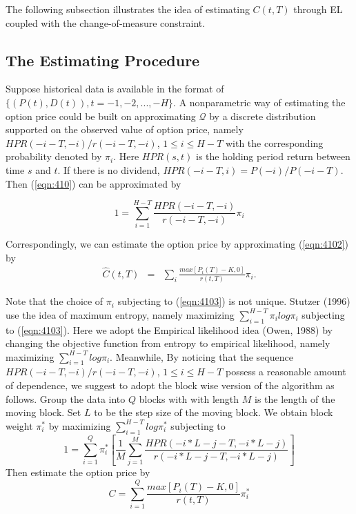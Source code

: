 \documentclass[oneside,english]{amsbook}
\numberwithin{section}{chapter}
\numberwithin{equation}{section}
\numberwithin{figure}{section}
\theoremstyle{plain}
\theoremstyle{plain}
\theoremstyle{definition}
\theoremstyle{plain}
\theoremstyle{plain}
\theoremstyle{remark}
\theoremstyle{definition}
\theoremstyle{definition}
\begin{document}
The following subsection illustrates the idea of estimating $C(t,T)$  through EL coupled with the change-of-measure constraint. 

\subsection{The Estimating Procedure}
Suppose historical data is available in the format of $\{(P(t),D(t)),t=-1,-2,...,-H\}$. A nonparametric way of estimating the option price could be built on approximating $\mathcal{Q}$ by a discrete distribution supported on the observed value of option price, namely $HPR(-i-T,-i)/r(-i-T,-i)$, $1\leq i\leq H-T$ with the corresponding probability denoted by $\pi_i$. Here $HPR(s,t)$ is the holding period return between time $s$ and $t$. If there is no dividend, $HPR(-i-T,i)=P(-i)/P(-i-T)$. Then (\ref{eqn:410}) can be approximated by 

\begin{equation}\label{eqn:4103}
1=\sum_{i=1}^{H-T} \frac{HPR(-i-T,-i)}{r(-i-T,-i)}\pi_i
\end{equation}

Correspondingly, we can estimate the option price by approximating (\ref{eqn:4102}) by
\begin{eqnarray}
\hat{C}(t,T)&=& \sum_{i} \frac{max[P_i(T)-K,0]}{r(t,T)}  \pi_i.
\end{eqnarray}

Note that the choice of $\pi_i$ subjecting to (\ref{eqn:4103}) is not unique. Stutzer (1996) use the idea of maximum entropy, namely maximizing $\sum^{H-T}_{i=1}\pi_ilog\pi_i$ subjecting to (\ref{eqn:4103}). Here we adopt the Empirical likelihood idea (Owen, 1988) by changing the objective function from entropy to empirical likelihood, namely maximizing $\sum^{H-T}_{i=1}log\pi_i$. Meanwhile, By noticing that the sequence $HPR(-i-T,-i)/r(-i-T,-i)$, $1\leq i\leq H-T$ possess a reasonable amount of dependence, we suggest to adopt the block wise version of the algorithm as follows. Group the data into $Q$ blocks with with length $M$ is the length of the moving block. Set $L$ to be the step size of the moving block. We obtain block weight $\pi^*_i$ by maximizing $\sum_{i=1}^{H-T} log\pi_i^*$ subjecting to 
\begin{equation}\label{eqn:4104}
1=\sum_{i=1}^{Q} \pi^*_i \left[\frac{1}{M} \sum_{j=1}^M \frac{HPR(-i*L-j-T, -i*L-j)}{r(-i*L-j-T, -i*L-j)}\right]
\end{equation} 
Then estimate the option price by 
\begin{equation}\label{eqn:4105}
C  =  \sum_{i=1}^Q \frac{max[P_i(T)-K,0]}{r(t,T)}  \pi^*_i
\end{equation} 
\end{document}
